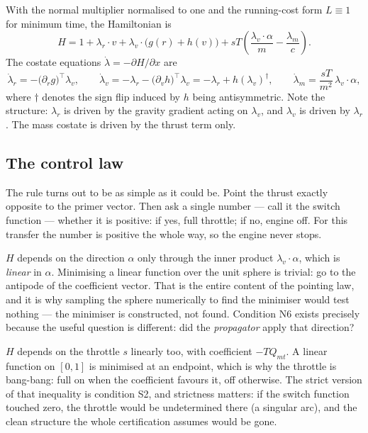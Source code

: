 \documentclass[11pt]{article}
\newcommand{\lv}{\lambda_v}\newcommand{\lr}{\lambda_r}\newcommand{\lm}{\lambda_m}
\newcommand{\Qmt}{Q_{mt}}
\begin{document}
\begin{rig}
With the normal multiplier normalised to one and the running-cost form
$L \equiv 1$ for minimum time, the Hamiltonian is
\begin{equation}\label{eq:H}
H = 1 + \lr \cdot v + \lv \cdot \big(g(r) + h(v)\big)
+ sT\left(\frac{\lv \cdot \alpha}{m} - \frac{\lm}{c}\right).
\end{equation}
The costate equations $\dot\lambda = -\partial H / \partial x$ are
\begin{equation}\label{eq:costate}
\dot\lr = -\big(\partial_r g\big)^{\!\top} \lv, \qquad
\dot\lv = -\lr - \big(\partial_v h\big)^{\!\top} \lv = -\lr + h(\lv)^{\!\dagger}, \qquad
\dot\lm = \frac{sT}{m^2}\, \lv \cdot \alpha,
\end{equation}
where $\dagger$ denotes the sign flip induced by $h$ being antisymmetric.
Note the structure: $\lr$ is driven by the gravity gradient acting on $\lv$,
and $\lv$ is driven by $\lr$. The mass costate is driven by the thrust term
only.
\end{rig}

\subsection{The control law}

\begin{eli}
The rule turns out to be as simple as it could be. Point the thrust exactly
opposite to the primer vector. Then ask a single number --- call it the switch
function --- whether it is positive: if yes, full throttle; if no, engine off.
For this transfer the number is positive the whole way, so the engine never
stops.
\end{eli}

\begin{intu}
$H$ depends on the direction $\alpha$ only through the inner product
$\lv \cdot \alpha$, which is \emph{linear} in $\alpha$. Minimising a linear
function over the unit sphere is trivial: go to the antipode of the coefficient
vector. That is the entire content of the pointing law, and it is why sampling
the sphere numerically to find the minimiser would test nothing --- the
minimiser is constructed, not found. Condition N6 exists precisely because the
useful question is different: did the \emph{propagator} apply that direction?

$H$ depends on the throttle $s$ linearly too, with coefficient $-T\Qmt$. A
linear function on $[0,1]$ is minimised at an endpoint, which is why the
throttle is bang-bang: full on when the coefficient favours it, off otherwise.
The strict version of that inequality is condition S2, and strictness matters:
if the switch function touched zero, the throttle would be undetermined there
(a singular arc), and the clean structure the whole certification assumes would
be gone.
\end{intu}
\end{document}
